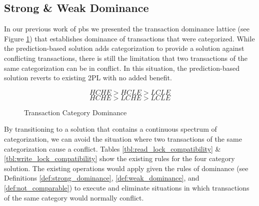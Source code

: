 \subsection{Strong \& Weak Dominance}
\label{sec:dominance}

In our previous work of \gls{pbs} we presented the transaction dominance lattice (see Figure \ref{fig:category_lattice_2}) that establishes dominance of transactions that were categorized. While the prediction-based solution adds categorization to provide a solution against conflicting transactions, there is still the limitation that two transactions of the same categorization can be in conflict. In this situation, the prediction-based solution reverts to existing 2PL with no added benefit.


\[\textrm{$HCHE > HCLE > LCLE$}\]
\[\textrm{$HCHE > LCHE > LCLE$} \]

\begin{figure}[h]
\captionsetup{justification=centering}
\centering %


\caption{Transaction Category Dominance} %
\label{fig:category_lattice_2} %

\end{figure}

By transitioning to a solution that contains a continuous spectrum of categorization, we can avoid the situation where two transactions of the same categorization cause a conflict. Tables \ref{tbl:read_lock_compatibility} \& \ref{tbl:write_lock_compatibility} show the existing rules for the four category solution. The existing operations would apply given the rules of dominance (see Definitions \ref{def:strong_dominance}, \ref{def:weak_dominance}, and \ref{def:not_comparable}) to execute and eliminate situations in which transactions of the same category would normally conflict.

